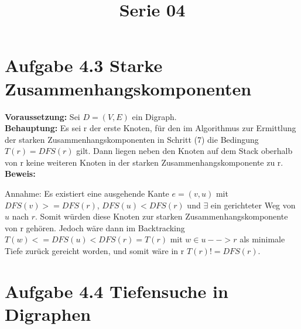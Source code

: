  
\title{Serie 04}

 

\section*{Aufgabe 4.3 Starke Zusammenhangskomponenten}

\textbf{Voraussetzung: }Sei $D=(V,E)$ ein Digraph.\\
\noindent
\textbf{Behauptung: } Es sei r der erste Knoten, für den im Algorithmus zur Ermittlung der starken Zusammenhangskomponenten in Schritt (7) die Bedingung $T(r) =  DFS(r)$ gilt. Dann liegen neben den Knoten auf dem Stack oberhalb von r keine weiteren Knoten in der starken Zusammenhangskomponente zu r.\\
\noindent
\textbf{Beweis: }

Annahme: Es existiert eine ausgehende Kante $e = (v,u)$ mit $DFS(v) >= DFS(r)$, $DFS(u) < DFS(r)$ und $\exists$ ein gerichteter Weg von $u$ nach $r$. Somit würden diese Knoten zur starken Zusammenhangskomponente von r gehören. Jedoch wäre dann im Backtracking $T(w) <= DFS(u) < DFS(r) = T(r)$ mit $w \in {u --> r}$ als minimale Tiefe zurück gereicht worden, und somit wäre in r $T(r) != DFS(r)$.


\section*{Aufgabe 4.4 Tiefensuche in Digraphen}


